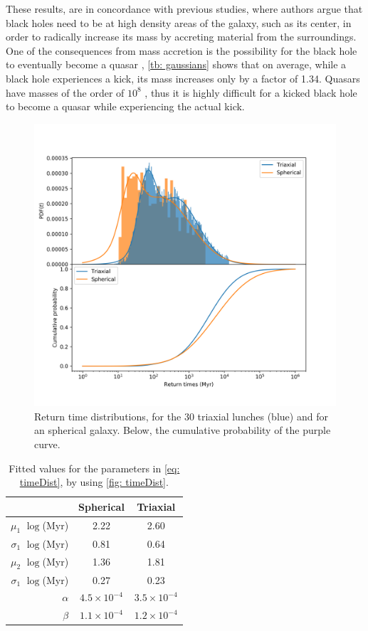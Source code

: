 	These results, are in concordance with previous studies, where authors argue that black holes need to be at high density areas of the galaxy, such as its center, in order to radically increase its mass by accreting material from the surroundings. One of the consequences from mass accretion is the possibility for the black hole to eventually become a quasar \cite{tanaka2009assembly}, \autoref{tb: gaussians} shows that on average, while a black hole experiences a kick, its mass increases only by a factor of 1.34. Quasars have masses of the order of $10^8$ \sm, thus it is highly difficult for a kicked black hole to become a quasar while experiencing the actual kick.
	\begin{figure}[h]
		\centering
		\includegraphics[width = 0.8\linewidth]{"../Files/Week 14/dist_times"}
		\caption{Return time distributions, for the 30 triaxial lunches (blue) and for an spherical galaxy. Below, the cumulative probability of the purple curve.}
		\label{fig: timeDist}
	\end{figure}

	\begin{table}[h]
		\centering
		\caption{Fitted values for the parameters in \autoref{eq: timeDist}, by using \autoref{fig: timeDist}.}
		\begin{tabular}{r|cc}
			\hline
			& \textbf{Spherical} & \textbf{Triaxial} \\
			\hline
			$\mu_1$ $\log$(Myr) & 2.22 & 2.60\\
			$\sigma_1$ $\log$(Myr) & 0.81 & 0.64\\
			$\mu_2$ $\log$(Myr) & 1.36 & 1.81\\
			$\sigma_1$ $\log$(Myr) & 0.27 & 0.23\\
			$\alpha$ & $4.5\times10^{-4}$ & $3.5\times10^{-4}$\\
			$\beta$ & $1.1\times10^{-4}$ & $1.2\times10^{-4}$\\
			\hline
		\end{tabular}
	\end{table}

